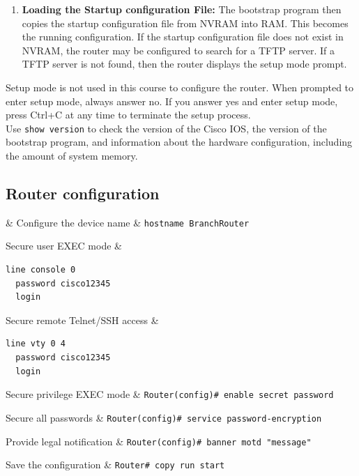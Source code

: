 {\begin{enumerate}
\item \textbf{Loading the Startup configuration File:} The bootstrap program then copies the startup configuration file from NVRAM into RAM. This becomes the running configuration. If the startup configuration file does not exist in NVRAM, the router may be configured to search for a TFTP server. If a TFTP server is not found, then the router displays the setup mode prompt.
\end{enumerate}

\note Setup mode is not used in this course to configure the router. When prompted to enter setup mode, always answer no. If you answer yes and enter setup mode, press Ctrl+C at any time to terminate the setup process.\\

Use \verb|show version| to check the version of the Cisco IOS, the version of the bootstrap program, and information about the hardware configuration, including the amount of system memory.

\subsection{Router configuration}

 & \w
Configure the device name & \verb|hostname BranchRouter| \w

Secure user EXEC mode & 
\begin{minipage}{4in}
\begin{verbatim}
line console 0
  password cisco12345
  login
\end{verbatim} 
\end{minipage} \w

Secure remote Telnet/SSH access & 
\begin{minipage}{4in}
\begin{verbatim}
line vty 0 4
  password cisco12345
  login
\end{verbatim} 
\end{minipage} \w

Secure privilege EXEC mode & \verb|Router(config)# enable secret password|\w

Secure all passwords & \verb|Router(config)# service password-encryption|\w

Provide legal notification & \verb|Router(config)# banner motd "message"|\w

Save the configuration & \verb|Router# copy run start|\w

}
